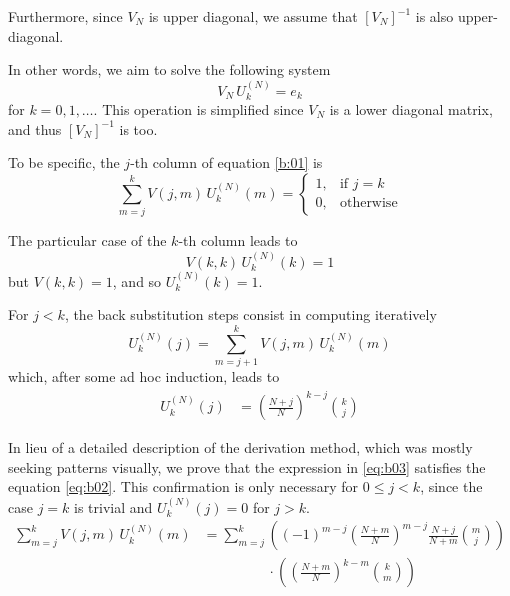 \documentclass{article}
\newcommand{\ppar}[1]{\left( #1 \right)}
\newcommand{\spar}[1]{\left[ #1 \right]}
\begin{document}
Furthermore, since $V_N$ is upper diagonal, we assume that $\spar{V_N}^{-1}$ is also upper-diagonal.







In other words, we aim to solve the following system
\begin{equation}
    V_N\, U_k^{(N)} = e_k
    \label{b:01}
\end{equation}
for $k = 0, 1, \dots$. This operation is simplified since 
$V_N$ is a lower diagonal matrix, and thus $\spar{V_N}^{-1}$ is too.

To be specific, the $j$-th column of equation \eqref{b:01} is
\begin{equation}
    \sum_{m=j}^k V(j,m)\, U_k^{(N)}(m) = 
    \begin{cases}
        1, &\text{if } j=k \\
        0, &\text{otherwise}
    \end{cases}
    \label{eq:b02}
\end{equation}

The particular case of the $k$-th column leads to
\begin{equation}
    V(k,k)\, U_k^{(N)}(k) = 
    1
\end{equation}
but $V(k,k) = 1$, and so $U_k^{(N)}(k) = 1$.

For $j<k$, the back substitution steps consist in computing iteratively
\begin{equation}
    U_k^{(N)}(j) = \sum_{m=j+1}^k V(j,m)\, U_k^{(N)}(m)
\end{equation}
which, after some ad hoc induction, leads to
\begin{align}
U_k^{(N)}(j)
    &=
    \ppar{\frac{N+j}{N}}^{k-j} \binom{k}{j}
    \label{eq:b03}
\end{align}

In lieu of a detailed description of the derivation method, which was mostly seeking patterns visually, we prove that the expression in \eqref{eq:b03} satisfies the equation \eqref{eq:b02}.
%
This confirmation is only necessary for $0\leq j<k$, since the case $j=k$ is trivial and $U_k^{(N)}(j)=0$ for $j> k$.
\begin{align*}
    \sum_{m=j}^k V(j,m)\, U_k^{(N)}(m)
    &=
    \sum_{m=j}^k 
    \ppar{ (-1)^{m-j} \ppar{\frac{N+m}{N}}^{m-j} \frac{N+j}{N+m} \binom{m}{j} }
    \\
    &\phantom{=}
    \phantom{\sum_{m=j}^k} \cdot
    \ppar{\ppar{\frac{N+m}{N}}^{k-m} \binom{k}{m}}
\end{align*}
\end{document}
